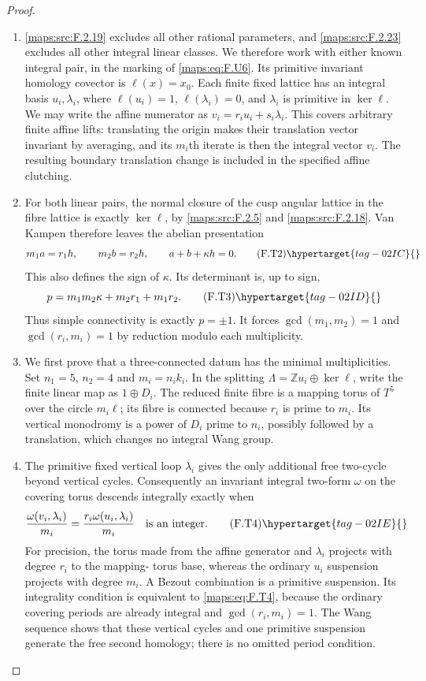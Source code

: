 \begin{proof}
\begin{enumerate}[label={$\langle1\rangle$\arabic*.}]
\item \ref{maps:src:F.2.19} excludes all other rational parameters, and \ref{maps:src:F.2.23}
excludes all other integral linear classes.
We therefore work with either known integral pair, in the
marking of \eqref{maps:eq:F.U6}.  Its primitive invariant homology
covector is $\ell(x)=x_0$.
Each finite fixed lattice has an integral basis
$u_i,\lambda_i$, where $\ell(u_i)=1$,
$\ell(\lambda_i)=0$, and $\lambda_i$ is primitive in
$\ker\ell$.
We may write the affine numerator as
$v_i=r_i u_i+s_i\lambda_i$.
This covers arbitrary finite affine lifts: translating the
origin makes their translation vector invariant by averaging,
and its $m_i$th iterate is then the integral vector $v_i$.
The resulting boundary translation change is included in the
specified affine clutching.

\item For both linear pairs, the normal closure of the cusp angular
lattice in the fibre lattice is exactly $\ker\ell$, by
\ref{maps:src:F.2.5} and \ref{maps:src:F.2.18}.  Van Kampen therefore leaves the abelian
presentation
\[
 m_1a=r_1h,\qquad m_2b=r_2h,\qquad
 a+b+\kappa h=0.
 \tag{F.T2}\hypertarget{tag-02IC}{}\label{maps:eq:F.T2}
\]
This also defines the sign of $\kappa$.
Its determinant is, up to sign,
\[
 p=m_1m_2\kappa+m_2r_1+m_1r_2.
 \tag{F.T3}\hypertarget{tag-02ID}{}\label{maps:eq:F.T3}
\]
Thus simple connectivity is exactly $p=\pm1$.
It forces $\gcd(m_1,m_2)=1$ and
$\gcd(r_i,m_i)=1$ by reduction modulo each multiplicity.

\item We first prove that a three-connected datum has the minimal
multiplicities.  Set $n_1=5$, $n_2=4$ and $m_i=n_i k_i$.
In the splitting $\Lambda=\mathbb Zu_i\oplus\ker\ell$,
write the finite linear map as $1\oplus D_i$.
The reduced finite fibre is a mapping torus of $T^5$ over
the circle $m_i\ell$; its fibre is connected because
$r_i$ is prime to $m_i$.
Its vertical monodromy is a power of $D_i$ prime to $n_i$,
possibly followed by a translation, which changes no
integral Wang group.

\item The primitive fixed vertical loop $\lambda_i$ gives the
only additional free two-cycle beyond vertical cycles.
Consequently an invariant integral two-form $\omega$ on
the covering torus descends integrally exactly when
\[
 \frac{\omega(v_i,\lambda_i)}{m_i}
       =\frac{r_i\omega(u_i,\lambda_i)}{m_i}
       \quad\text{is an integer}.
 \tag{F.T4}\hypertarget{tag-02IE}{}\label{maps:eq:F.T4}
\]
For precision, the torus made from the affine generator
and $\lambda_i$ projects with degree $r_i$ to the mapping-
torus base, whereas the ordinary $u_i$ suspension projects
with degree $m_i$.  A Bezout combination is a primitive
suspension.  Its integrality condition is equivalent to
\eqref{maps:eq:F.T4}, because the ordinary covering periods are already
integral and $\gcd(r_i,m_i)=1$.
The Wang sequence shows that these vertical cycles and one
primitive suspension generate the free second homology;
there is no omitted period condition.


\end{enumerate}
\end{proof}
